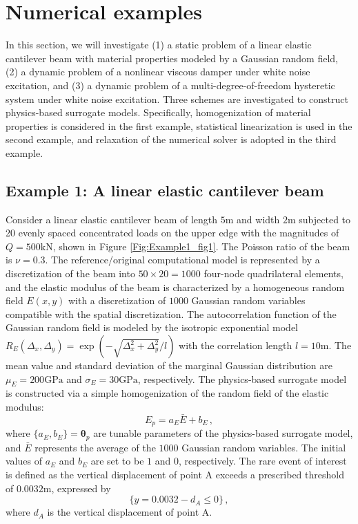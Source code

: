 \documentclass[number,preprint,3p]{elsarticle}
\newcommand{\1}[2]{\mathbb{I}_{#1}\left(#2\right)}
\newcommand{\vect}[1]{\boldsymbol{#1}}
\begin{document}
	\section{Numerical examples}\label{Sec:Application}
	\noindent In this section, we will investigate (1) a static problem of a linear elastic cantilever beam with material properties modeled by a Gaussian random field, (2) a dynamic problem of a nonlinear viscous damper under white noise excitation, and (3) a dynamic problem of a multi-degree-of-freedom hysteretic system under white noise excitation. Three schemes are investigated to construct physics-based surrogate models. Specifically, homogenization of material properties is considered in the first example, statistical linearization is used in the second example, and relaxation of the numerical solver is adopted in the third example.
	
	\subsection{Example 1: A linear elastic cantilever beam }\label{Sec:Applicationone}
	\noindent Consider a linear elastic cantilever beam of length $5$m and width $2$m subjected to 20 evenly spaced concentrated loads on the upper edge with the magnitudes of $Q=500\mathrm{kN}$, shown in Figure \ref{Fig:Example1_fig1}. The Poisson ratio of the beam is $\nu=0.3$. The reference/original computational model is represented by a discretization of the beam into $50\times20=1000$ four-node quadrilateral elements, and the elastic modulus of the beam is characterized by a homogeneous random field $E(x,y)$ with a discretization of $1000$ Gaussian random variables compatible with the spatial discretization. The autocorrelation function of the Gaussian random field is modeled by the isotropic exponential model $R_{E}(\Delta _{x},\Delta _{y})=\exp\left (-\sqrt{\Delta _{x}^2+\Delta _{y}^2}/l  \right )$ with the correlation length $l=10\mathrm{m}$. The mean value and standard deviation of the marginal Gaussian distribution are $\mu _{E}=200\mathrm{GPa}$ and $\sigma _{E}=30\mathrm{GPa}$, respectively. The physics-based surrogate model is constructed via a simple homogenization of the random field of the elastic modulus: 
 \begin{equation}
  E_{p}=a_{E}\bar{E}+b_{E}\,,   
 \end{equation}
 where $\{a_{E},b_{E}\}=\vect\theta_p$ are tunable parameters of the physics-based surrogate model, and $\bar{E}$ represents the average of the $1000$ Gaussian random variables. The initial values of $a_{E}$ and $b_{E}$ are set to be $1$ and $0$, respectively. The rare event of interest is defined as the vertical displacement of point A exceeds a prescribed threshold of $0.0032\mathrm{m}$, expressed by
 \begin{equation}
   \{y=0.0032-d_A\leq0\}\,,  
 \end{equation}
where $d_A$ is the vertical displacement of point A.  
\end{document}
